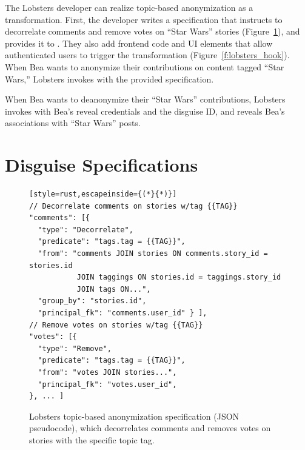 %
The Lobsters developer can realize topic-based anonymization as a \xxing
transformation.
%
First, the developer writes a \xx specification that instructs \sys to
decorrelate comments and remove votes on ``Star Wars'' stories
(Figure~\ref{f:spec}), and provides it to \sys.
%
They also add frontend code and UI elements that allow authenticated users to
trigger the \xxing transformation (Figure~\ref{f:lobsters_hook}).
%
When Bea wants to anonymize their contributions on content tagged ``Star Wars,''
Lobsters invokes \sys with the provided specification.

%
When Bea wants to deanonymize their ``Star Wars'' contributions, Lobsters
invokes \sys with Bea's reveal credentials and the disguise ID, and \sys reveals
Bea's associations with ``Star Wars'' posts.
%


\section{Disguise Specifications}
\label{s:spec}

\begin{figure}[t]
\centering
\begin{lstlisting}[style=rust,escapeinside={(*}{*)}]
// Decorrelate comments on stories w/tag {{TAG}}
"comments": [{
  "type": "Decorrelate",
  "predicate": "tags.tag = {{TAG}}",
  "from": "comments JOIN stories ON comments.story_id = stories.id
           JOIN taggings ON stories.id = taggings.story_id
           JOIN tags ON...",
  "group_by": "stories.id",
  "principal_fk": "comments.user_id" } ],
// Remove votes on stories w/tag {{TAG}}
"votes": [{
  "type": "Remove",
  "predicate": "tags.tag = {{TAG}}",
  "from": "votes JOIN stories...",
  "principal_fk": "votes.user_id",
}, ... ]
\end{lstlisting}
    \caption[Lobsters topic-based anonymization disguise specification.]{Lobsters topic-based anonymization \xx specification (JSON
    pseudocode), which decorrelates comments and removes votes on stories with
    the specific topic tag.}
\label{f:spec}
\end{figure}


